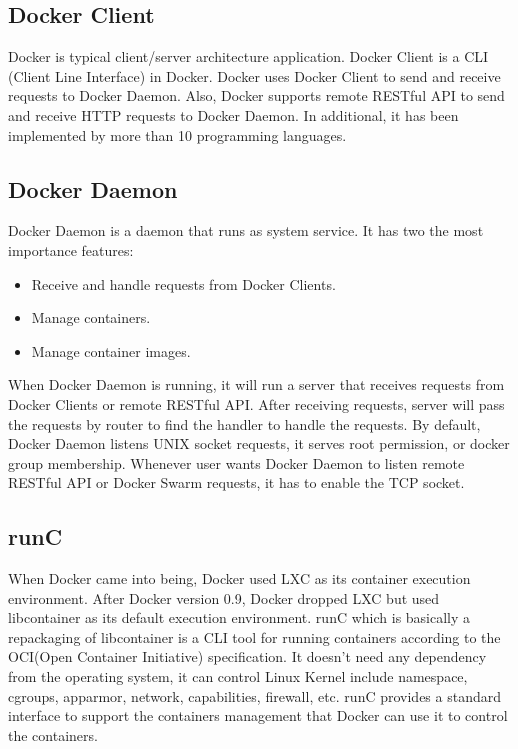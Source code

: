 \subsection{Docker Client}
Docker is typical client/server architecture application.
Docker Client is a \linebreak CLI (Client Line Interface) in Docker.
Docker uses Docker Client to send and receive requests to Docker Daemon. Also, Docker supports remote RESTful API to send and receive HTTP requests to Docker Daemon.
In additional, it has been implemented by more than 10 programming languages.

\subsection{Docker Daemon}
Docker Daemon is a daemon that runs as system service. It has two the most importance features: 
\begin{itemize}
    \item Receive and handle requests from Docker Clients.
    \item Manage containers.
    \item Manage container images.
\end{itemize}
When Docker Daemon is running, it will run a server that receives requests from Docker Clients or remote RESTful API. After receiving requests, server will pass the requests by router to find the handler to handle the requests. By default, Docker Daemon listens UNIX socket requests, it serves root permission, or docker group membership. Whenever user wants Docker Daemon to listen remote RESTful API or Docker Swarm requests, it has to enable the TCP socket.

\subsection{runC}
When Docker came into being, Docker used LXC as its container execution environment. After Docker version 0.9, Docker dropped LXC but used libcontainer as its default execution environment.
runC which is basically a repackaging of libcontainer is a CLI tool for running containers according to the OCI(Open Container Initiative) specification. It doesn't need any dependency from the operating system, it can control Linux Kernel include namespace, cgroups, apparmor, network, capabilities, firewall, etc.
runC provides a standard interface to support the containers management that Docker can use it to control the containers.

